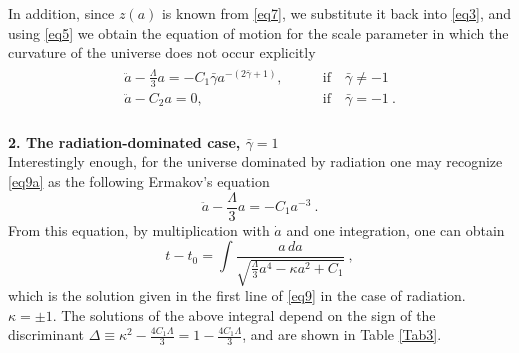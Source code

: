 \documentclass[
showkeys,
preprintnumbers,amsmath,amssymb,APS]{revtex4}
\begin{document}
In addition, since $z(a)$ is known from \eqref{eq7}, we substitute it back into \eqref{eq3}, and using \eqref{eq5} we obtain the equation of motion for the scale parameter in which the curvature of the universe does not occur explicitly
\begin{eqnarray}\label{eq9a}
\begin{array}{lll}
\ddot a-\frac{\Lambda}{3}a=-C_1\bar \gamma a^{-(2\bar\gamma+1)}, \qquad &  \mathrm{if} \quad  \bar{\gamma}\ne -1\\
\ddot a-C_2a=0, \qquad & \mathrm{if} \quad  \bar{\gamma}= -1~.\\
\end{array}
\end{eqnarray}


{\bf 2. The radiation-dominated case, $\bar{\gamma}=1$}\\

Interestingly enough, for the universe dominated by radiation one may recognize \eqref{eq9a} as the following Ermakov's equation
\begin{equation}\label{eq9b}
\ddot a-\frac{\Lambda}{3}a=-C_1a^{-3}~.
\end{equation}
From this equation, by multiplication with $\dot a$ and one integration, one can obtain 
\begin{equation}\label{eq9c}
 {\displaystyle t-t_0=\int \frac{a \, da}{\sqrt{\frac \Lambda 3  a^4-\kappa a^2+C_1}}~,}
 \end{equation}
which is the solution given in the first line of \eqref{eq9} in the case of radiation.\\

$\kappa =\pm 1$. The solutions of the above integral depend on the sign of the discriminant $\Delta\equiv \kappa^2-\frac{4C_1\Lambda}{3}=1-\frac{4C_1\Lambda}{3}$, and are shown in Table \ref{Tab3}. 
\end{document}
